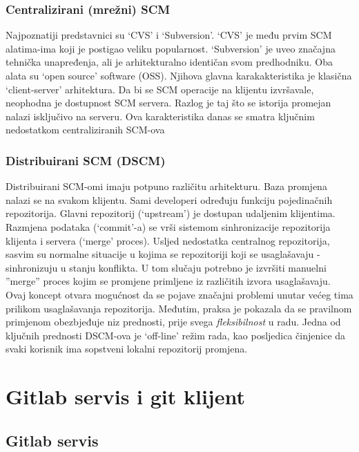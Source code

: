 \documentclass[times, utf8, seminar]{fit}
\begin{document}
\subsection{Centralizirani (mrežni) SCM}

Najpoznatiji predstavnici su `CVS' i `Subversion'. `CVS' je među prvim SCM alatima-ima koji je postigao veliku popularnost. `Subversion' je uveo značajna tehnička unapređenja, ali je arhitekturalno identičan svom predhodniku. Oba alata su `open source' software (OSS). Njihova glavna karakakteristika je klasična `client-server' arhitektura. Da bi se SCM operacije na klijentu izvršavale, neophodna je dostupnost SCM servera. Razlog je taj što se istorija promejan nalazi isključivo na serveru. Ova karakteristika danas se smatra ključnim nedostatkom centraliziranih SCM-ova

\subsection{Distribuirani SCM (DSCM)}

Distribuirani SCM-omi imaju potpuno različitu arhitekturu. Baza promjena nalazi se na svakom klijentu.
Sami developeri određuju funkciju pojedinačnih repozitorija. Glavni repozitorij (`upstream') je dostupan udaljenim klijentima.
Razmjena podataka (`commit'-a) se vrši sistemom sinhronizacije repozitorija klijenta i servera (`merge' proces). 
Usljed nedostatka centralnog repozitorija, sasvim su normalne situacije u kojima se repozitoriji koji se usaglašavaju - sinhronizuju u stanju konflikta.
U tom slučaju potrebno je izvršiti manuelni ''merge'' proces kojim se promjene primljene iz različitih izvora usaglašavaju.
Ovaj koncept otvara mogućnost da se pojave značajni problemi unutar većeg tima prilikom usaglašavanja repozitorija. Međutim, praksa je pokazala da se pravilnom primjenom obezbjeđuje niz prednosti, prije svega \emph{fleksibilnost} u radu. Jedna od ključnih prednosti DSCM-ova je `off-line' režim rada, kao posljedica činjenice da svaki korisnik ima sopstveni lokalni repozitorij promjena.

\chapter{Gitlab servis i git klijent}
\vspace*{-0.7cm}

\section{Gitlab servis}
\end{document}
